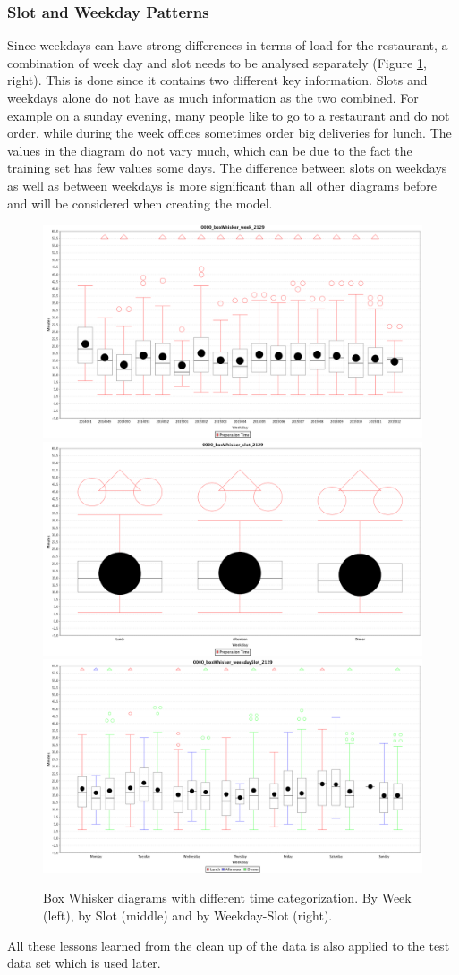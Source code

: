 \subsubsection{Slot and Weekday Patterns}
Since weekdays can have strong differences in terms of load for the restaurant, a combination of week day and slot needs to be analysed separately (Figure \ref{fig:triple_boxWhisker}, right).
This is done since it contains two different key information. Slots and weekdays alone do not have as much information as the two combined. For example on a sunday evening, many people like to go to a restaurant and do not order, while during the week offices sometimes order big deliveries for lunch. The values in the diagram do not vary much, which can be due to the fact the training set has few values some days.\newline
The difference between slots on weekdays as well as between weekdays is more significant than all other diagrams before and will be considered when creating the model.

\begin{figure}[htp]

\centering
\includegraphics[width=.3\textwidth]{images/0000_boxWhisker_week_2129.png}\hfill
\includegraphics[width=.3\textwidth]{images/0000_boxWhisker_slot_2129.png}\hfill
\includegraphics[width=.3\textwidth]{images/0000_boxWhisker_weekdaySlot_2129.png}

\caption{Box Whisker diagrams with different time categorization. By Week (left), by Slot (middle) and by Weekday-Slot (right).}
\label{fig:triple_boxWhisker}

\end{figure}

All these lessons learned from the clean up of the data is also applied to the test data set which is used later.


